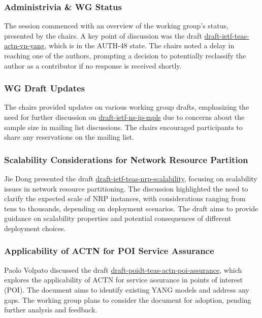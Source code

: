 \documentclass{article}
\begin{document}
\subsubsection{Administrivia \& WG Status}
The session commenced with an overview of the working group's status, presented by the chairs. A key point of discussion was the draft \href{https://datatracker.ietf.org/doc/html/draft-ietf-teas-actn-vn-yang}{draft-ietf-teas-actn-vn-yang}, which is in the AUTH-48 state. The chairs noted a delay in reaching one of the authors, prompting a decision to potentially reclassify the author as a contributor if no response is received shortly.

\subsubsection{WG Draft Updates}
The chairs provided updates on various working group drafts, emphasizing the need for further discussion on \href{https://datatracker.ietf.org/doc/html/draft-ietf-ns-ip-mpls}{draft-ietf-ns-ip-mpls} due to concerns about the sample size in mailing list discussions. The chairs encouraged participants to share any reservations on the mailing list.

\subsubsection{Scalability Considerations for Network Resource Partition}
Jie Dong presented the draft \href{https://datatracker.ietf.org/doc/draft-ietf-teas-nrp-scalability/07/}{draft-ietf-teas-nrp-scalability}, focusing on scalability issues in network resource partitioning. The discussion highlighted the need to clarify the expected scale of NRP instances, with considerations ranging from tens to thousands, depending on deployment scenarios. The draft aims to provide guidance on scalability properties and potential consequences of different deployment choices.

\subsubsection{Applicability of ACTN for POI Service Assurance}
Paolo Volpato discussed the draft \href{https://datatracker.ietf.org/doc/draft-poidt-teas-actn-poi-assurance/05/}{draft-poidt-teas-actn-poi-assurance}, which explores the applicability of ACTN for service assurance in points of interest (POI). The document aims to identify existing YANG models and address any gaps. The working group plans to consider the document for adoption, pending further analysis and feedback.
\end{document}
